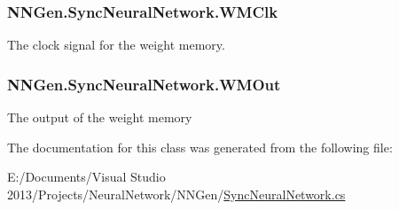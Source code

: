 \subsubsection[{W\+M\+Clk}]{ N\+N\+Gen.\+Sync\+Neural\+Network.\+W\+M\+Clk\hspace{0.3cm}{\ttfamily [get]}}\label{class_n_n_gen_1_1_sync_neural_network_ad0473c03570ed0231da8b2d62487b99a}


The clock signal for the weight memory. 

\hypertarget{class_n_n_gen_1_1_sync_neural_network_aed787094117713be3ef2eaa612e321e1}{}
\subsubsection[{W\+M\+Out}]{ N\+N\+Gen.\+Sync\+Neural\+Network.\+W\+M\+Out\hspace{0.3cm}{\ttfamily [get]}}\label{class_n_n_gen_1_1_sync_neural_network_aed787094117713be3ef2eaa612e321e1}


The output of the weight memory 



The documentation for this class was generated from the following file\+:\begin{DoxyCompactItemize}
\item 
E\+:/\+Documents/\+Visual Studio 2013/\+Projects/\+Neural\+Network/\+N\+N\+Gen/\hyperlink{_sync_neural_network_8cs}{Sync\+Neural\+Network.\+cs}\end{DoxyCompactItemize}
